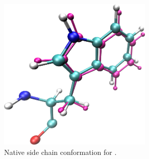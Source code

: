 \begin{figure}[h]
  \centering
  \includegraphics[width=0.65\textwidth,height=0.3\textheight,keepaspectratio]{figures/mutation_side_chain_images/1fcc_43.png}
  \caption{Native side chain conformation for .}
  \label{figure:computational_mutation_scanning/figname}
\end{figure}


